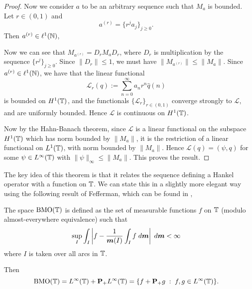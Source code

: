 \begin{proof}
    Now we consider $a$ to be an arbitrary sequence such that $M_a$ is bounded. Let $r \in (0,1)$
    and
    \begin{equation*}
        a^{(r)} = \{r^ja_j\}_{j\geq 0}.
    \end{equation*}
    Then $a^{(r)} \in \ell^1(\mathbb{N})$,
    
    Now we can see that $M_{a^{(r)}} = D_r M_a D_r$, where $D_r$
    is multiplication by the sequence $\{r^j\}_{j\geq 0}$. Since $\|D_r\| \leq 1$, 
    we must have $\|M_{a^{(r)}}\| \leq \|M_a\|$. Since $a^{(r)} \in \ell^1(\mathbb{N})$, 
    we have that the linear functional
    \begin{equation*}
        \mathcal{L}_r(q) := \sum_{n=0}^\infty a_nr^n \hat{q}(n)
    \end{equation*}
    is bounded on $H^1(\mathbb{T})$, and the functionals $\{\mathcal{L}_r\}_{r \in (0,1)}$
    converge strongly to $\mathcal{L}$, and are uniformly bounded. Hence $\mathcal{L}$
    is continuous on $H^1(\mathbb{T})$. 
    
    Now by the Hahn-Banach theorem, since $\mathcal{L}$ is a linear
    functional on the subspace $H^1(\mathbb{T})$ which has norm bounded
    by $\|M_a\|$, it is the restriction
    of a linear functional on $L^1(\mathbb{T})$, with norm bounded by $\|M_a\|$.
    Hence $\mathcal{L}(q) = (\psi,q)$ for some $\psi \in L^\infty(\mathbb{T})$
    with $\|\psi\|_\infty \leq \|M_a\|$. This proves the result.    
\end{proof}

The key idea of this theorem is that it relates the sequence defining
a Hankel operator with a function on $\mathbb{T}$. We can state this in a slightly more
elegant way using the following result of Fefferman, which can be found in \cite{Garnett},
\begin{proposition}
    The space $\operatorname{BMO}(\mathbb{T})$ is defined as the set of measurable
    functions $f$ on $\mathbb{T}$ (modulo almost-everywhere equivalence) such that
    \begin{equation*}
        \sup_I \int_I \left|f-\frac{1}{\boldsymbol{m}(I)}\int_I f\;d\boldsymbol{m}\right|\;d\boldsymbol{m} < \infty
    \end{equation*}
    where $I$ is taken over all arcs in $\mathbb{T}$.
    
    Then 
    \begin{equation*}
        \operatorname{BMO}(\mathbb{T}) = L^\infty(\mathbb{T})+\mathbf{P}_+L^\infty(\mathbb{T}) = \{f+\mathbf{P}_+g\;:\;f,g \in L^\infty(\mathbb{T})\}.
    \end{equation*}
\end{proposition}

